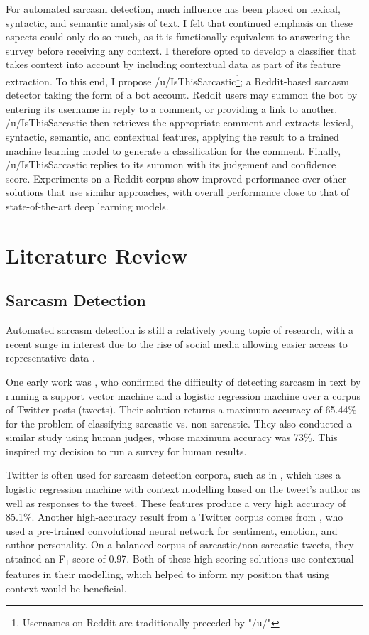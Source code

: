 \documentclass[a4paper,12pt]{article}
\begin{document}
For automated sarcasm detection, much influence has been placed on lexical, syntactic, and semantic analysis of text. I felt that continued emphasis on these aspects could only do so much, as it is functionally equivalent to answering the survey before receiving any context. I therefore opted to develop a classifier that takes context into account by including contextual data as part of its feature extraction. To this end, I propose /u/IsThisSarcastic\footnote{Usernames on Reddit are traditionally preceded by "/u/"}; a Reddit-based sarcasm detector taking the form of a bot account. Reddit users may summon the bot by entering its username in reply to a comment, or providing a link to another. /u/IsThisSarcastic then retrieves the appropriate comment and extracts lexical, syntactic, semantic, and contextual features, applying the result to a trained machine learning model to generate a classification for the comment. Finally, /u/IsThisSarcastic replies to its summon with its judgement and confidence score. Experiments on a Reddit corpus show improved performance over other solutions that use similar approaches, with overall performance close to that of state-of-the-art deep learning models.


\section{Literature Review}
\subsection{Sarcasm Detection}
Automated sarcasm detection is still a relatively young topic of research, with a recent surge in interest due to the rise of social media allowing easier access to representative data \cite{joshiAutomaticSarcasmDetection2016}.

One early work was \cite{gonzalez-ibanezIdentifyingSarcasmTwitter2011}, who confirmed the difficulty of detecting sarcasm in text by running a support vector machine and a logistic regression machine over a corpus of Twitter posts (tweets). Their solution returns a maximum accuracy of 65.44\% for the problem of classifying sarcastic vs. non-sarcastic. They also conducted a similar study using human judges, whose maximum accuracy was 73\%. This inspired my decision to run a survey for human results.

Twitter is often used for sarcasm detection corpora, such as in \cite{bammanContextualizedSarcasmDetection2015}, which uses a logistic regression machine with context modelling based on the tweet's author as well as responses to the tweet. These features produce a very high accuracy of 85.1\%. Another high-accuracy result from a Twitter corpus comes from \cite{poriaDeeperLookSarcastic2017}, who used a pre-trained convolutional neural network for sentiment, emotion, and author personality. On a balanced corpus of sarcastic/non-sarcastic tweets, they attained an F\textsubscript{1} score of 0.97. Both of these high-scoring solutions use contextual features in their modelling, which helped to inform my position that using context would be beneficial.
\end{document}
